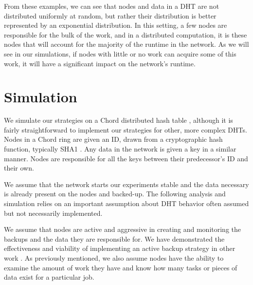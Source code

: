 \documentclass[11pt,conference]{IEEEtran}
\begin{document}
From these examples, we can see that nodes and data in a DHT are not distributed uniformly at random, but rather their distribution is better represented by  an exponential distribution.
In this setting, a few nodes are responsible for the bulk of the work, and in a distributed computation, it is these nodes that will account for the majority of the runtime in the network.
As we will see in our simulations, if nodes with little or no work can acquire some of this work, it will have a significant impact on the network's runtime.



\section{Simulation}
\label{sec:auto-simulation}



We simulate our strategies on a Chord distributed hash table \cite{chord}, although it is fairly straightforward to implement our strategies for other, more complex DHTs.
Nodes in a Chord ring are given an ID, drawn from a cryptographic hash function, typically SHA1 \cite{sha1}.
Any data in the network is given a key in a similar manner.
Nodes are responsible for all the keys between their predecessor's ID and their own.

We assume that the network starts our experiments stable and the data necessary is already present on the nodes and backed-up.
The following analysis and simulation relies on an important assumption about DHT behavior often assumed but not necessarily implemented.


We assume that nodes are active and aggressive in creating and monitoring the backups and the data they are responsible for.
We have demonstrated the effectiveness and viability of implementing an active backup strategy in other work \cite{chordreduce} \cite{urdht}.
As previously mentioned, we also assume nodes have the ability to examine the amount of work they have and know how many tasks or pieces of data exist for a particular job.
\end{document}
